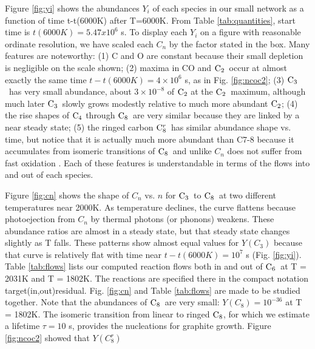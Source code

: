 \documentclass[manuscript]{aastex}
\newcommand{\ctwo}{${\rm C}_2$}
\newcommand{\cthree}{${\rm C}_3$}
\newcommand{\cfour}{${\rm C}_4$}
\newcommand{\csix}{${\rm C}_6$}
\newcommand{\ceight}{${\rm C}_8$}
\newcommand{\ceightr}{${\rm C}_8^r$}
\begin{document}
Figure \ref{fig:yi}
shows the abundances $Y_i$ of each species in our small network as a
function of time t-t(6000K) after T=6000K. From Table \ref{tab:quantities},
start time is $t(6000K) =5.47x10^6$ s. To display each $Y_i$ on a figure with
reasonable ordinate resolution, we have scaled each $C_n$ by the factor
stated in the box. Many features are noteworthy: (1) C and O are constant
because their small depletion is negligible on the scale shown;
(2) maxima in CO and \ctwo\ occur at almost exactly the same time
$t-t(6000K)= 4 \times 10^6$ s, as in Fig. \ref{fig:ncoc2};
(3) \cthree\ has very small abundance, about $3 \times 10^{-8}$ of \ctwo
at the \ctwo\ maximum, although much later \cthree\ slowly grows modestly
relative to much more abundant \ctwo; (4) the rise shapes of \cfour
through \ceight\ are very similar because they are linked by a near steady
state; (5) the ringed carbon \ceightr\ has similar abundance shape vs. time,
but notice that it is actually much more abundant than C7-8 because it
accumulates from isomeric transitions of \ceight\ and unlike $C_n$ does not
suffer from fast oxidation \citep{1999Sci...283.1290C}. Each of these
features is understandable in terms of the flows into and out of each species. 

Figure \ref{fig:cn} shows the shape of $C_n$ vs. $n$ for \cthree\ to
\ceight\ at two different temperatures near 2000K. As temperature declines,
the curve flattens because photoejection from $C_n$ by thermal photons
(or phonons) weakens. These abundance ratios are almost in a steady state,
but that steady state changes slightly as T falls. These patterns show
almost equal values for $Y(C_3)$ because that curve is relatively flat
with time near $t-t(6000K) = 10^7$ s (Fig. \ref{fig:yi}).
Table \ref{tab:flows} lists our computed reaction flows both in and out of
\csix\ at T = 2031K and T = 1802K. The reactions are specified there in the
compact notation target(in,out)residual. Fig. \ref{fig:cn} and
Table \ref{tab:flows} are made to be studied together.
Note that the abundances of \ceight\ are very small:
$Y(C_8)= 10^{-36}$ at T = 1802K. The isomeric transition from linear to
ringed \ceight, for which we estimate a lifetime $\tau = 10$ s,
provides the nucleations for graphite growth. Figure \ref{fig:ncoc2} showed
that $Y(C_{8}^r)$ 
\end{document}
